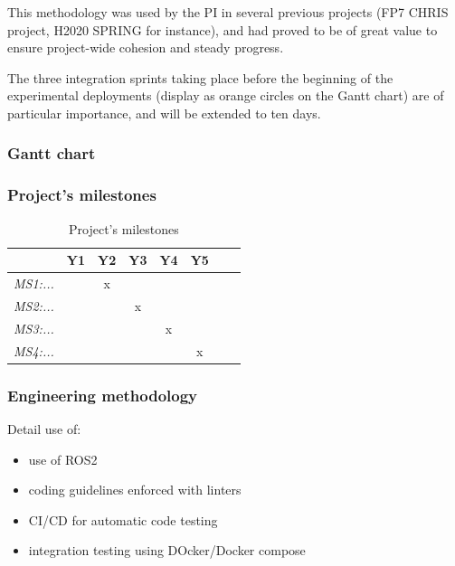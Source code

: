 This methodology was used by the PI in  several previous projects (FP7 CHRIS
project, H2020 SPRING for instance), and had proved to be of great value to
ensure project-wide cohesion and steady progress.

The three integration sprints taking place before the beginning of the
experimental deployments (display as orange circles on the Gantt chart) are of
particular importance, and will be extended to ten days.


\subsubsection{Gantt chart}

\begin{figure}[!ht]
\resizebox{\linewidth}{!}{
    
}
\end{figure}


\subsubsection{Project's milestones}

\begin{table}[h!]
    \centering
\begin{tabular}{@{}lccccccr@{}}
\toprule
\textit{\textbf{}}              & \textbf{Y1} & \textbf{Y2} & \textbf{Y3} & \textbf{Y4} & \textbf{Y5} \\ \midrule
\textit{MS1:...} &   & x  &    &   &    &  &   \\ 
\textit{MS2:...} &   &    & x  &   &    &  &   \\ 
\textit{MS3:...} &   &    &    & x &    &  &   \\ 
\textit{MS4:...} &   &    &    &   & x  &  &   \\ \bottomrule
\end{tabular}
    \caption{Project's milestones}
    \label{milestones}
\end{table}

\subsubsection{Engineering methodology}


\begin{rewrite}

Detail use of:
\begin{itemize}
    \item use of ROS2
    \item coding guidelines enforced with linters
    \item CI/CD for automatic code testing
    \item integration testing using DOcker/Docker compose
\end{itemize}

\end{rewrite}

